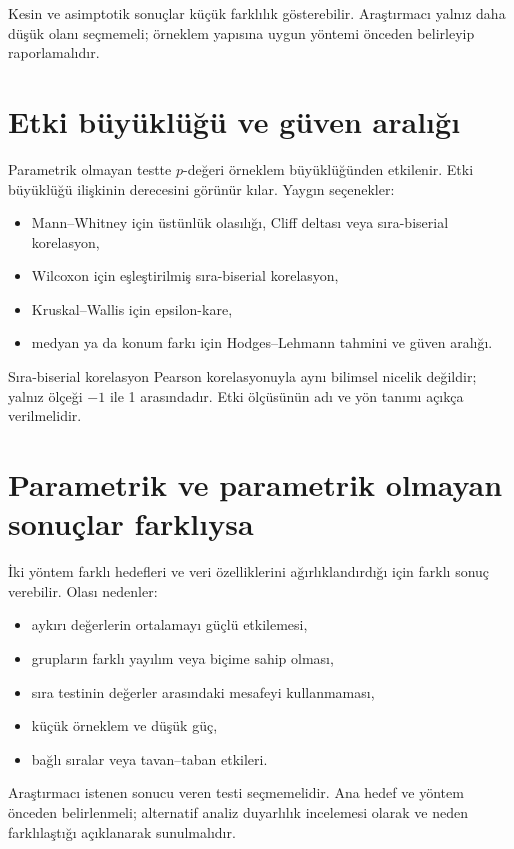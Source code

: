 Kesin ve asimptotik sonuçlar küçük farklılık gösterebilir. Araştırmacı yalnız
daha düşük olanı seçmemeli; örneklem yapısına uygun yöntemi önceden belirleyip
raporlamalıdır.

\section{Etki büyüklüğü ve güven aralığı}

Parametrik olmayan testte $p$-değeri örneklem büyüklüğünden etkilenir. Etki
büyüklüğü ilişkinin derecesini görünür kılar. Yaygın seçenekler:

\begin{itemize}
  \item Mann--Whitney için üstünlük olasılığı, Cliff deltası veya sıra-biserial korelasyon,
  \item Wilcoxon için eşleştirilmiş sıra-biserial korelasyon,
  \item Kruskal--Wallis için epsilon-kare,
  \item medyan ya da konum farkı için Hodges--Lehmann tahmini ve güven aralığı.
\end{itemize}

Sıra-biserial korelasyon Pearson korelasyonuyla aynı bilimsel nicelik değildir;
yalnız ölçeği $-1$ ile 1 arasındadır. Etki ölçüsünün adı ve yön tanımı açıkça
verilmelidir.

\section{Parametrik ve parametrik olmayan sonuçlar farklıysa}

İki yöntem farklı hedefleri ve veri özelliklerini ağırlıklandırdığı için
farklı sonuç verebilir. Olası nedenler:

\begin{itemize}
  \item aykırı değerlerin ortalamayı güçlü etkilemesi,
  \item grupların farklı yayılım veya biçime sahip olması,
  \item sıra testinin değerler arasındaki mesafeyi kullanmaması,
  \item küçük örneklem ve düşük güç,
  \item bağlı sıralar veya tavan--taban etkileri.
\end{itemize}

Araştırmacı istenen sonucu veren testi seçmemelidir. Ana hedef ve yöntem
önceden belirlenmeli; alternatif analiz duyarlılık incelemesi olarak ve neden
farklılaştığı açıklanarak sunulmalıdır.

